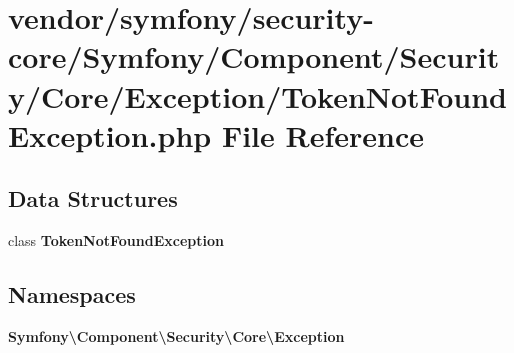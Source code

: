 \section{vendor/symfony/security-\/core/\+Symfony/\+Component/\+Security/\+Core/\+Exception/\+Token\+Not\+Found\+Exception.php File Reference}
\label{_token_not_found_exception_8php}
\subsection*{Data Structures}
\begin{DoxyCompactItemize}
\item 
class {\bf Token\+Not\+Found\+Exception}
\end{DoxyCompactItemize}
\subsection*{Namespaces}
\begin{DoxyCompactItemize}
\item 
 {\bf Symfony\textbackslash{}\+Component\textbackslash{}\+Security\textbackslash{}\+Core\textbackslash{}\+Exception}
\end{DoxyCompactItemize}
